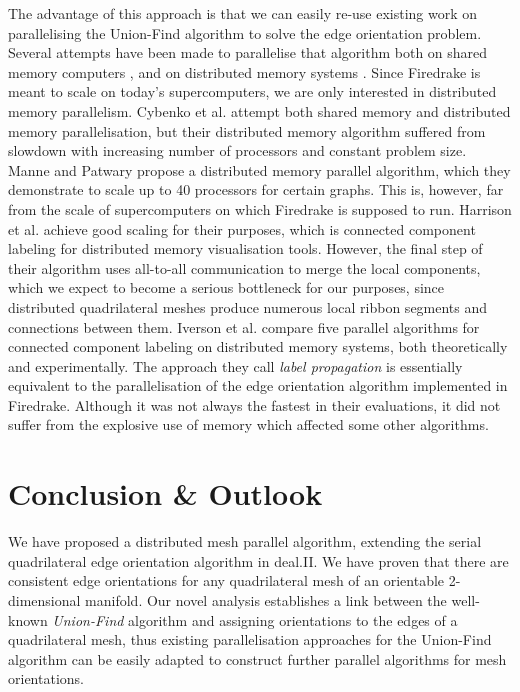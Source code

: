 \documentclass[oneeqnum,onethmnum,onefignum,onetabnum]{siamltex1213}
\begin{document}
The advantage of this approach is that we can easily re-use existing
work on parallelising the Union-Find algorithm to solve the edge
orientation problem.
Several attempts have been made to parallelise that algorithm both
on shared memory computers \cite{Cybenko1988, Anderson1991, Bader2005,
  Patwary2012}, and on distributed memory systems \cite{Cybenko1988,
  Manne2010, Harrison2011, Iverson2015}.
Since Firedrake is meant to scale on today's supercomputers, we are
only interested in distributed memory parallelism.
Cybenko et al.\@ \cite{Cybenko1988} attempt both shared memory and
distributed memory parallelisation, but their distributed memory
algorithm suffered from slowdown with increasing number of processors
and constant problem size.
Manne and Patwary \cite{Manne2010} propose a distributed memory
parallel algorithm, which they demonstrate to scale up to 40
processors for certain graphs. This is, however, far from the scale
of supercomputers on which Firedrake is supposed to run.
Harrison et al.\@ \cite{Harrison2011} achieve good scaling for their
purposes, which is connected component labeling for distributed
memory visualisation tools. However, the final step of their algorithm
uses all-to-all communication to merge the local components, which we
expect to become a serious bottleneck for our purposes, since
distributed quadrilateral meshes produce numerous local ribbon
segments and connections between them.
Iverson et al.\@ \cite{Iverson2015} compare five parallel algorithms
for connected component labeling on distributed memory systems, both
theoretically and experimentally. The approach they call \emph{label
  propagation} is essentially equivalent to the parallelisation of
the edge orientation algorithm implemented in Firedrake.
Although it was not always the fastest in their evaluations,
it did not suffer from the explosive use of memory which affected some
other algorithms.

\section{Conclusion \& Outlook}
\label{sec:conclusion}

We have proposed a distributed mesh parallel algorithm, extending the
serial quadrilateral edge orientation algorithm in deal.II.
We have proven that there are consistent edge orientations for any
quadrilateral mesh of an orientable 2-dimensional manifold.
Our novel analysis establishes a link between the well-known
\emph{Union-Find} algorithm and assigning orientations to the edges of
a quadrilateral mesh, thus existing parallelisation approaches for
the Union-Find algorithm can be easily adapted to construct further
parallel algorithms for mesh orientations.


\end{document}
